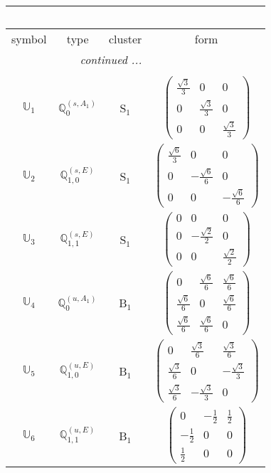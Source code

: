 \documentclass[fleqn,10pt,landscape]{article}
\begin{document}
\begin{itemize}
\begin{center}
\begin{longtable}{c|c|c|c}
\multicolumn{3}{l}{\tablename\ \thetable{}} \\
 \hline \hline
symbol & type & cluster & form \\ \hline \endhead

 \hline \hline
\multicolumn{3}{r}{\footnotesize\it continued ...} \\ \endfoot

 \hline \hline
\multicolumn{3}{r}{} \\ \endlastfoot

$ \mathbb{U}_{1} $ & $\mathbb{Q}_{0}^{(s,A_{1})}$ & S$_{1}$ & $\begin{pmatrix} \frac{\sqrt{3}}{3} & 0 & 0 \\ 0 & \frac{\sqrt{3}}{3} & 0 \\ 0 & 0 & \frac{\sqrt{3}}{3} \end{pmatrix}$ \\
$ \mathbb{U}_{2} $ & $\mathbb{Q}_{1,0}^{(s,E)}$ & S$_{1}$ & $\begin{pmatrix} \frac{\sqrt{6}}{3} & 0 & 0 \\ 0 & - \frac{\sqrt{6}}{6} & 0 \\ 0 & 0 & - \frac{\sqrt{6}}{6} \end{pmatrix}$ \\
$ \mathbb{U}_{3} $ & $\mathbb{Q}_{1,1}^{(s,E)}$ & S$_{1}$ & $\begin{pmatrix} 0 & 0 & 0 \\ 0 & - \frac{\sqrt{2}}{2} & 0 \\ 0 & 0 & \frac{\sqrt{2}}{2} \end{pmatrix}$ \\ \hline
$ \mathbb{U}_{4} $ & $\mathbb{Q}_{0}^{(u,A_{1})}$ & B$_{1}$ & $\begin{pmatrix} 0 & \frac{\sqrt{6}}{6} & \frac{\sqrt{6}}{6} \\ \frac{\sqrt{6}}{6} & 0 & \frac{\sqrt{6}}{6} \\ \frac{\sqrt{6}}{6} & \frac{\sqrt{6}}{6} & 0 \end{pmatrix}$ \\
$ \mathbb{U}_{5} $ & $\mathbb{Q}_{1,0}^{(u,E)}$ & B$_{1}$ & $\begin{pmatrix} 0 & \frac{\sqrt{3}}{6} & \frac{\sqrt{3}}{6} \\ \frac{\sqrt{3}}{6} & 0 & - \frac{\sqrt{3}}{3} \\ \frac{\sqrt{3}}{6} & - \frac{\sqrt{3}}{3} & 0 \end{pmatrix}$ \\
$ \mathbb{U}_{6} $ & $\mathbb{Q}_{1,1}^{(u,E)}$ & B$_{1}$ & $\begin{pmatrix} 0 & - \frac{1}{2} & \frac{1}{2} \\ - \frac{1}{2} & 0 & 0 \\ \frac{1}{2} & 0 & 0 \end{pmatrix}$ \\

\end{longtable}
\end{center}
\end{itemize}
\end{document}
